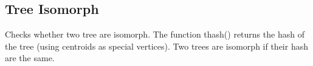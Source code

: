\subsection{Tree Isomorph}

Checks whether two tree are isomorph. 
The function thash() returns the hash of the tree (using centroids as special vertices).
Two trees are isomorph if their hash are the same.